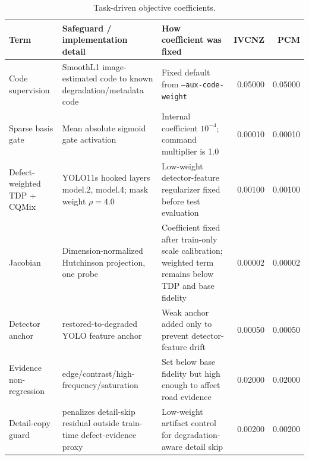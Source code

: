 \begin{table}[!t]
\centering
\caption{Task-driven objective coefficients.}
\label{tab:task_objective_audit}
\small
\setlength{\tabcolsep}{4pt}
\begin{tabularx}{\textwidth}{p{}p{}p{}rr}
\toprule
Term & Safeguard / implementation detail & How coefficient was fixed & IVCNZ & PCM \\
\midrule
Code supervision & SmoothL1 image-estimated code to known degradation/metadata code & Fixed default from \texttt{--aux-code-weight} & 0.05000 & 0.05000 \\
Sparse basis gate & Mean absolute sigmoid gate activation & Internal coefficient $10^{-4}$; command multiplier is 1.0 & 0.00010 & 0.00010 \\
Defect-weighted TDP + CQMix & YOLO11s hooked layers model.2, model.4; mask weight $\rho=4.0$ & Low-weight detector-feature regularizer fixed before test evaluation & 0.00100 & 0.00100 \\
Jacobian & Dimension-normalized Hutchinson projection, one probe & Coefficient fixed after train-only scale calibration; weighted term remains below TDP and base fidelity & 0.00002 & 0.00002 \\
Detector anchor & restored-to-degraded YOLO feature anchor & Weak anchor added only to prevent detector-feature drift & 0.00050 & 0.00050 \\
Evidence non-regression & edge/contrast/high-frequency/saturation & Set below base fidelity but high enough to affect road evidence & 0.02000 & 0.02000 \\
Detail-copy guard & penalizes detail-skip residual outside train-time defect-evidence proxy & Low-weight artifact control for degradation-aware detail skip & 0.00200 & 0.00200 \\
\bottomrule
\end{tabularx}
\end{table}
